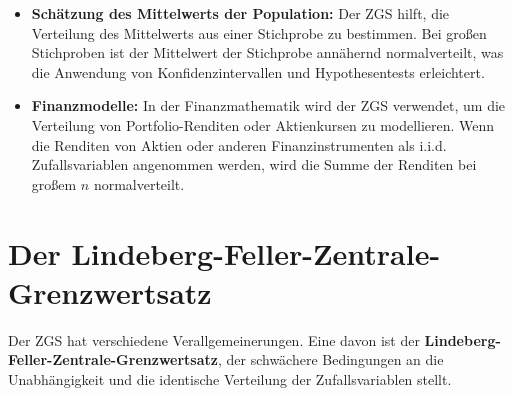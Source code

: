 \documentclass{article}
\begin{document}
\begin{itemize}
    \item \textbf{Schätzung des Mittelwerts der Population:} Der ZGS hilft, die Verteilung des Mittelwerts aus einer Stichprobe zu bestimmen. Bei großen Stichproben ist der Mittelwert der Stichprobe annähernd normalverteilt, was die Anwendung von Konfidenzintervallen und Hypothesentests erleichtert.
    \item \textbf{Finanzmodelle:} In der Finanzmathematik wird der ZGS verwendet, um die Verteilung von Portfolio-Renditen oder Aktienkursen zu modellieren. Wenn die Renditen von Aktien oder anderen Finanzinstrumenten als i.i.d. Zufallsvariablen angenommen werden, wird die Summe der Renditen bei großem \(n\) normalverteilt.
\end{itemize}

\section*{Der Lindeberg-Feller-Zentrale-Grenzwertsatz}

Der ZGS hat verschiedene Verallgemeinerungen. Eine davon ist der \textbf{Lindeberg-Feller-Zentrale-Grenzwertsatz}, der schwächere Bedingungen an die Unabhängigkeit und die identische Verteilung der Zufallsvariablen stellt.
\end{document}
